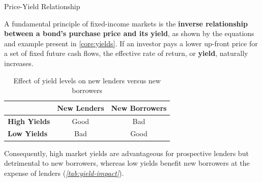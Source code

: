 \documentclass[10pt]{article}
\begin{document}
    \begin{core}[label=core:price_yield]{Price-Yield Relationship}

      A fundamental principle of fixed-income markets is the \textbf{inverse relationship between a bond's purchase price and its yield}, as shown by the equations and example present in \autoref{core:yields}. If an investor pays a lower up-front price for a set of fixed future cash flows, the effective rate of return, or \textbf{yield}, naturally increases.

      \begin{table}[H]
        \centering
        \begin{tabular}{lcc}
          \hline
          \hline
          & \textbf{New Lenders} & \textbf{New Borrowers} \\
          \hline
          \textbf{High Yields} & Good & Bad \\
          \textbf{Low Yields}  & Bad  & Good \\
          \hline
        \end{tabular}
        \caption{Effect of yield levels on new lenders versus new borrowers}
        \label{tab:yield-impact}
      \end{table}

      Consequently, high market yields are advantageous for prospective lenders but detrimental to new borrowers, whereas low yields benefit new borrowers at the expense of lenders (\textit{\autoref{tab:yield-impact}}).

    \end{core}
\end{document}
